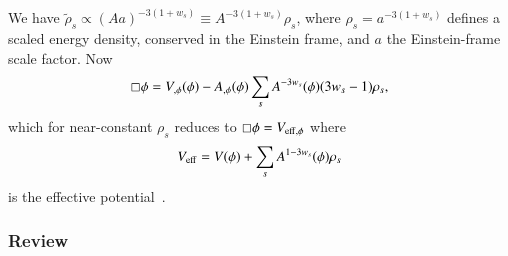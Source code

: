     We have $\widetilde{\rho}_s\propto (Aa)^{-3(1+w_s)} \equiv A^{-3(1+w_s)}\rho_s$, where $\rho_s=a^{-3(1+w_s)}$ defines a scaled energy density, conserved in the Einstein frame, and $a$ the Einstein-frame scale factor. Now
    \begin{equation}
        \sq \phi = V_{,\phi}(\phi) - A_{,\phi}(\phi) \sum_{s} A^{-3w_s}(\phi) (3w_s-1)\rho_s,
    \end{equation}
    which for near-constant $\rho_s$ reduces to $\sq \phi = V_{\mathrm{eff},\phi}$ where~\citep{hinterbichlerSymmetronCosmology2011}
    \begin{equation}
        V_\mathrm{eff} = V(\phi) + \sum_s A^{1-3w_s}(\phi) \rho_s
    \end{equation}
    is the effective potential~. 

    


    \subsubsection{Review}

